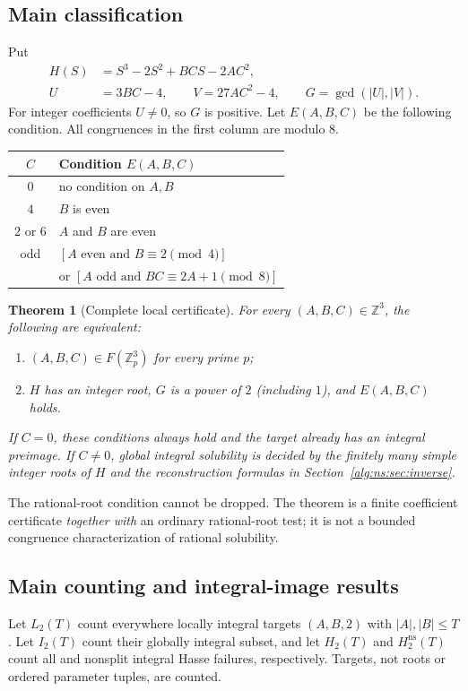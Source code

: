 \documentclass[11pt]{article}
\numberwithin{equation}{section}
\newtheorem{theorem}{Theorem}[section]
\theoremstyle{plain}
\theoremstyle{plain}
\theoremstyle{plain}
\theoremstyle{definition}
\theoremstyle{definition}
\theoremstyle{definition}
\theoremstyle{remark}
\newcommand{\Z}{\mathbb Z}\newcommand{\Q}{\mathbb Q}
\newcommand{\NS}{\mathrm{ns}}\newcommand{\spc}{\mathrm{sp}}
\begin{document}
\subsection{Main classification}
Put
\begin{equation}\label{alg:ns:eq:HUV}
\begin{aligned}
H(S)&=S^3-2S^2+BCS-2AC^2,\\
U&=3BC-4,\qquad V=27AC^2-4,\qquad G=\gcd(|U|,|V|).
\end{aligned}
\end{equation}
For integer coefficients $U\ne0$, so $G$ is positive. Let $E(A,B,C)$
be the following condition. All congruences in the first column are
modulo $8$.
\begin{center}
\begin{tabular}{@{}cl@{}}
\toprule
$C$ & Condition $E(A,B,C)$\\
\midrule
$0$ & no condition on $A,B$\\
$4$ & $B$ is even\\
$2$ or $6$ & $A$ and $B$ are even\\
odd & $[A\text{ even and }B\equiv2\pmod4]$\\
 & \quad or $[A\text{ odd and }BC\equiv2A+1\pmod8]$\\
\bottomrule
\end{tabular}
\end{center}

\begin{theorem}[Complete local certificate]\label{alg:ns:thm:main}
For every $(A,B,C)\in\Z^3$, the following are equivalent:
\begin{enumerate}[label=(\roman*)]
\item $(A,B,C)\in F(\Z_p^3)$ for every prime $p$;
\item $H$ has an integer root, $G$ is a power of $2$ (including $1$),
and $E(A,B,C)$ holds.
\end{enumerate}
If $C=0$, these conditions always hold and the target already has an
integral preimage. If $C\ne0$, global integral solubility is decided by
the finitely many simple integer roots of $H$ and the reconstruction
formulas in Section~\ref{alg:ns:sec:inverse}.
\end{theorem}
The rational-root condition cannot be dropped. The theorem is a finite
coefficient certificate \emph{together with} an ordinary rational-root
test; it is not a bounded congruence characterization of rational
solubility.

\subsection{Main counting and integral-image results}
Let $L_2(T)$ count everywhere locally integral targets $(A,B,2)$ with
$|A|,|B|\le T$. Let $I_2(T)$ count their globally integral subset, and
let $H_2(T)$ and $H_2^{\NS}(T)$ count all and nonsplit integral Hasse
failures, respectively. Targets, not roots or ordered parameter tuples,
are counted.
\end{document}

